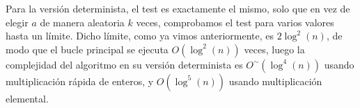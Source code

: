 Para la versión determinista, el test es exactamente el mismo, solo que en vez de elegir $a$ de manera aleatoria $k$ veces, comprobamos el test para varios valores hasta un límite. Dicho límite, como ya vimos anteriormente, es $2\log^2(n)$, de modo que el bucle principal se ejecuta $O(\log^2(n))$ veces, luego la complejidad del algoritmo en su versión determinista es $O^\sim(\log^4(n))$ usando multiplicación rápida de enteros, y $O(\log^5(n))$ usando multiplicación elemental.

\endinput
